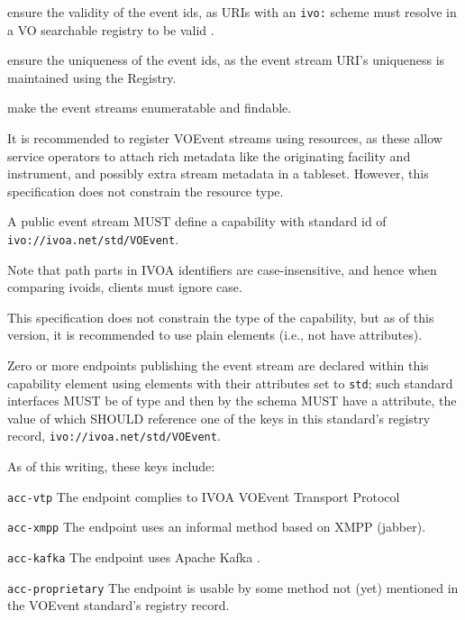 \documentclass[11pt,a4paper]{ivoa}
\begin{document}
\begin{compactitem}
\item ensure the validity of the event ids, as URIs with an \verb|ivo:|
scheme must resolve in a VO searchable registry to be valid
\citep{2016ivoa.spec.0523D}.
\item ensure the uniqueness of the event ids, as the event stream URI's
uniqueness is maintained using the Registry.
\item make the event streams enumeratable and findable.
\end{compactitem}

It is recommended to register VOEvent streams using
 resources, as these allow service operators
to attach rich metadata like the originating facility and instrument, and
possibly extra stream metadata in a tableset.  However, this
specification does not constrain the resource type.

A public event stream MUST define a capability with standard id of
\nolinkurl{ivo://ivoa.net/std/VOEvent}.

Note that path parts in IVOA identifiers are case-insensitive, and hence
when comparing ivoids, clients must ignore case.

This specification does not constrain the type of the capability, but as
of this version, it is recommended to use plain 
elements (i.e., not have  attributes).

Zero or more endpoints publishing the event stream are declared within
this capability element using  elements with their
 attributes set to \verb|std|; such standard interfaces MUST
be of type  and then by the schema MUST have
a  attribute, the value of which SHOULD reference one
of the keys in this standard's registry record,
\nolinkurl{ivo://ivoa.net/std/VOEvent}.

As of this writing, these keys include:

\begin{compactitem}
\item  \verb|acc-vtp| The endpoint complies to IVOA VOEvent Transport
  Protocol \citep{2017ivoa.spec.0320S}
\item \verb|acc-xmpp| The endpoint uses an informal method based on
    	XMPP (jabber).
\item \verb|acc-kafka| The endpoint uses Apache Kafka \citep{TODO}.
\item \verb|acc-proprietary| The endpoint is usable by some
  method not (yet) mentioned in the VOEvent standard's registry record.
\end{compactitem}
\end{document}
